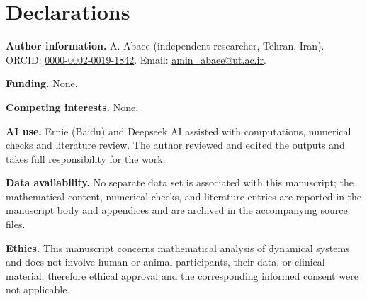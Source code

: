 \documentclass[11pt,a4paper]{article}
\theoremstyle{plain}
\theoremstyle{definition}
\theoremstyle{remark}
\numberwithin{equation}{section}
\numberwithin{figure}{section}
\begin{document}
\section*{Declarations}

\textbf{Author information.} A. Abaee (independent researcher, Tehran, Iran). ORCID: \href{https://orcid.org/0000-0002-0019-1842}{0000-0002-0019-1842}. Email: \href{mailto:amin_abaee@ut.ac.ir}{amin\_abaee@ut.ac.ir}.

\textbf{Funding.} None.

\textbf{Competing interests.} None.

\textbf{AI use.} Ernie (Baidu) and Deepseek AI assisted with computations, numerical checks and literature review. The author reviewed and edited the outputs and takes full responsibility for the work.

\textbf{Data availability.} No separate data set is associated with this manuscript; the mathematical content, numerical checks, and literature entries are reported in the manuscript body and appendices and are archived in the accompanying source files.

\textbf{Ethics.} This manuscript concerns mathematical analysis of dynamical systems and does not involve human or animal participants, their data, or clinical material; therefore ethical approval and the corresponding informed consent were not applicable.
\end{document}

